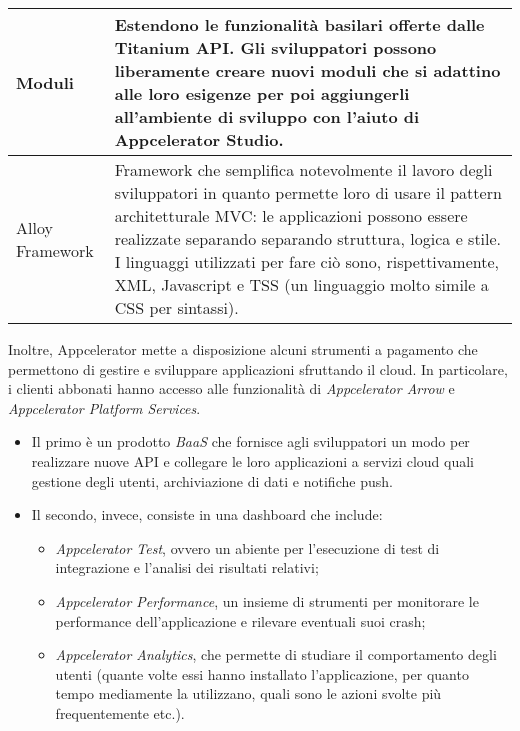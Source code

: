 				\begin{center}
					\begin{tabular}[H]{p{} p{}}
						Moduli				& Estendono le funzionalità basilari offerte dalle Titanium API. Gli
										  sviluppatori possono liberamente creare nuovi moduli che si
										  adattino alle loro esigenze per poi aggiungerli all'ambiente di
										  sviluppo con l'aiuto di Appcelerator Studio.\\
						\hline
						Alloy Framework			& Framework che semplifica notevolmente il lavoro degli sviluppatori
										  in quanto permette loro di usare il pattern architetturale MVC: le
										  applicazioni possono essere realizzate separando separando
										  struttura, logica e stile. I linguaggi utilizzati per fare ciò
										  sono, rispettivamente, XML, Javascript e TSS (un linguaggio molto
										  simile a CSS per sintassi).\\
					\end{tabular}
				\end{center}
				Inoltre, Appcelerator mette a disposizione alcuni strumenti a pagamento che permettono di gestire e sviluppare
				applicazioni sfruttando il cloud. In particolare, i clienti abbonati hanno accesso alle funzionalità di
				\emph{Appcelerator Arrow} e \emph{Appcelerator Platform Services}.
				\begin{itemize}
					\item Il primo è un prodotto \emph{BaaS} che fornisce agli sviluppatori un modo per realizzare nuove API e
					collegare le loro applicazioni a servizi cloud quali gestione degli utenti, archiviazione di dati e
					notifiche push.
					\item Il secondo, invece, consiste in una dashboard che include:
					\begin{itemize}
						\item \emph{Appcelerator Test}, ovvero un abiente per l'esecuzione di test di integrazione e
						l'analisi dei risultati relativi;
						\item \emph{Appcelerator Performance}, un insieme di strumenti per monitorare le performance
						dell'applicazione e rilevare eventuali suoi crash;
						\item \emph{Appcelerator Analytics}, che permette di studiare il comportamento degli utenti (quante
						volte essi hanno installato l'applicazione, per quanto tempo mediamente la utilizzano, quali sono
						le azioni svolte più frequentemente etc.).
					\end{itemize}
				\end{itemize}
